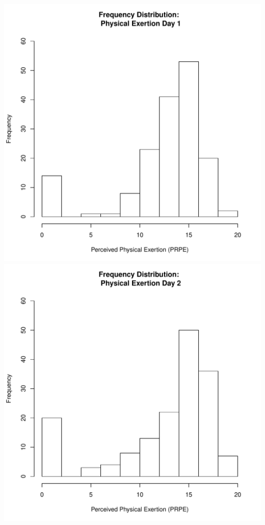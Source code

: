 \documentclass[12pt]{report}
\begin{document}
\clearpage
\includegraphics[scale =.4]{../images/distPrpeDay1.pdf}
\includegraphics[scale =.4]{../images/distPrpeDay2.pdf}
\end{document}
